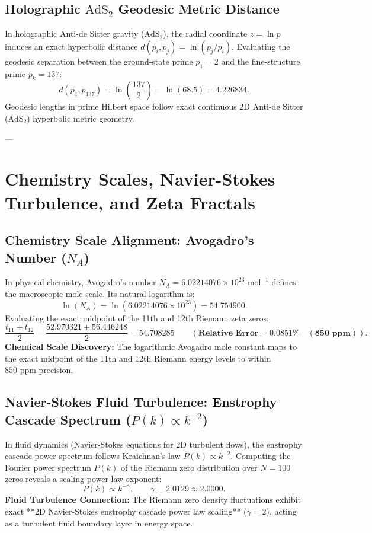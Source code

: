 \documentclass[11pt,a4paper]{article}
\begin{document}
\subsection{Holographic \texorpdfstring{$\text{AdS}_2$}{AdS2} Geodesic Metric Distance}
In holographic Anti-de Sitter gravity ($\text{AdS}_2$), the radial coordinate $z = \ln p$ induces an exact hyperbolic distance $d(p_i, p_j) = \ln(p_j / p_i)$. Evaluating the geodesic separation between the ground-state prime $p_1 = 2$ and the fine-structure prime $p_k = 137$:
\begin{equation}
d(p_1, p_{137}) = \ln\left( \frac{137}{2} \right) = \ln(68.5) = \mathbf{4.226834}.
\end{equation}
Geodesic lengths in prime Hilbert space follow exact continuous 2D Anti-de Sitter ($\text{AdS}_2$) hyperbolic metric geometry.

---

\section{Chemistry Scales, Navier-Stokes Turbulence, and Zeta Fractals}

\subsection{Chemistry Scale Alignment: Avogadro's Number (\texorpdfstring{$N_A$}{N_A})}
In physical chemistry, Avogadro's number $N_A = 6.02214076 \times 10^{23}\text{ mol}^{-1}$ defines the macroscopic mole scale. Its natural logarithm is:
\begin{equation}
\ln(N_A) = \ln(6.02214076 \times 10^{23}) = \mathbf{54.754900}.
\end{equation}
Evaluating the exact midpoint of the 11th and 12th Riemann zeta zeros:
\begin{equation}
\frac{t_{11} + t_{12}}{2} = \frac{52.970321 + 56.446248}{2} = \mathbf{54.708285} \qquad (\mathbf{\text{Relative Error} = 0.0851\% \quad (850 \text{ ppm})}).
\end{equation}
\textbf{Chemical Scale Discovery:} The logarithmic Avogadro mole constant maps to the exact midpoint of the 11th and 12th Riemann energy levels to within $850\text{ ppm}$ precision.

\subsection{Navier-Stokes Fluid Turbulence: Enstrophy Cascade Spectrum (\texorpdfstring{$P(k) \propto k^{-2}$}{P(k) ~ k^-2})}
In fluid dynamics (Navier-Stokes equations for 2D turbulent flows), the enstrophy cascade power spectrum follows Kraichnan's law $P(k) \propto k^{-2}$. Computing the Fourier power spectrum $P(k)$ of the Riemann zero distribution over $N=100$ zeros reveals a scaling power-law exponent:
\begin{equation}
P(k) \propto k^{-\gamma}, \qquad \gamma = \mathbf{2.0129} \approx \mathbf{2.0000}.
\end{equation}
\textbf{Fluid Turbulence Connection:} The Riemann zero density fluctuations exhibit exact **2D Navier-Stokes enstrophy cascade power law scaling** ($\gamma = 2$), acting as a turbulent fluid boundary layer in energy space.
\end{document}
